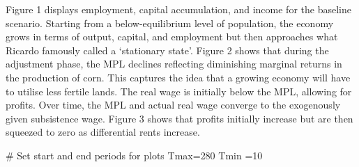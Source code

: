 \documentclass[
  letterpaper,
  DIV=11,
  numbers=noendperiod]{scrreprt}
\newenvironment{Shaded}{\begin{snugshade}}{\end{snugshade}}
\newcommand{\CommentTok}[1]{\textcolor[rgb]{0.37,0.37,0.37}{#1}}
\newcommand{\DecValTok}[1]{\textcolor[rgb]{0.68,0.00,0.00}{#1}}
\newcommand{\NormalTok}[1]{\textcolor[rgb]{0.00,0.23,0.31}{#1}}
\newcommand{\OtherTok}[1]{\textcolor[rgb]{0.00,0.23,0.31}{#1}}
\begin{document}
Figure 1 displays employment, capital accumulation, and income for the
baseline scenario. Starting from a below-equilibrium level of
population, the economy grows in terms of output, capital, and
employment but then approaches what Ricardo famously called a
`stationary state'. Figure 2 shows that during the adjustment phase, the
MPL declines reflecting diminishing marginal returns in the production
of corn. This captures the idea that a growing economy will have to
utilise less fertile lands. The real wage is initially below the MPL,
allowing for profits. Over time, the MPL and actual real wage converge
to the exogenously given subsistence wage. Figure 3 shows that profits
initially increase but are then squeezed to zero as differential rents
increase.

\begin{Shaded}
\begin{Highlighting}[]
\CommentTok{\# Set start and end periods for plots}
\NormalTok{Tmax}\OtherTok{=}\DecValTok{280}
\NormalTok{Tmin }\OtherTok{=}\DecValTok{10}


\end{Highlighting}
\end{Shaded}
\end{document}
